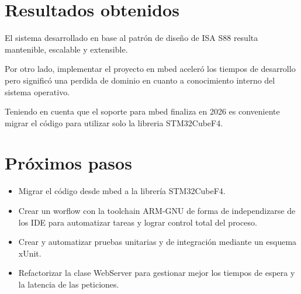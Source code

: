 \section{Resultados obtenidos}
El sistema desarrollado en base al patrón de diseño de ISA S88 resulta mantenible, escalable y extensible.

Por otro lado, implementar el proyecto en mbed aceleró los tiempos de desarrollo pero significó una perdida de dominio en cuanto a conocimiento interno del sistema operativo.

Teniendo en cuenta que el soporte para mbed finaliza en 2026 es conveniente migrar el código para utilizar solo la libreria STM32CubeF4.

\section{Próximos pasos}

\begin{itemize}
\item Migrar el código desde mbed a la librería STM32CubeF4.
\item Crear un worflow con la toolchain ARM-GNU de forma de independizarse de los IDE para automatizar tareas y lograr control total del proceso.
\item Crear y automatizar pruebas unitarias y de integración mediante un esquema xUnit.
\item Refactorizar la clase WebServer para gestionar mejor los tiempos de espera y la latencia de las peticiones.
\end{itemize}

